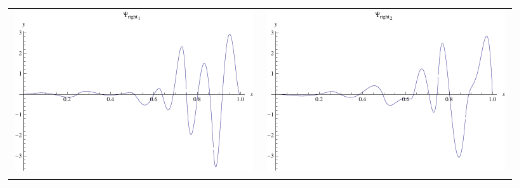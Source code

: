 \documentclass{article}
\begin{document}
\begin{landscape}
\begin{tabular}{cc}
\includegraphics[width=10.cm]{biquadratic_wavelet_dright_1.pdf}& \includegraphics[width=10.cm]{biquadratic_wavelet_dright_2.pdf} \\
\end{tabular} 
 \end{landscape}
\end{document}
